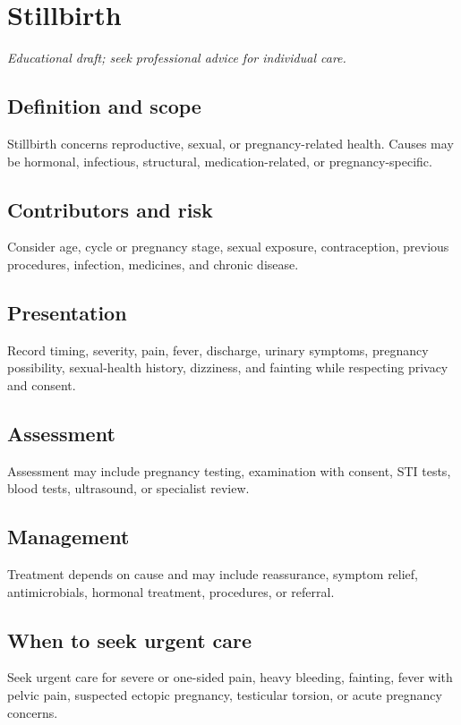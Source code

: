 \chapter{Stillbirth}
\medskip
\noindent\textit{Educational draft; seek professional advice for individual care.}

\section*{Definition and scope}
Stillbirth concerns reproductive, sexual, or pregnancy-related health. Causes may be hormonal, infectious, structural, medication-related, or pregnancy-specific.

\section*{Contributors and risk}
Consider age, cycle or pregnancy stage, sexual exposure, contraception, previous procedures, infection, medicines, and chronic disease.

\section*{Presentation}
Record timing, severity, pain, fever, discharge, urinary symptoms, pregnancy possibility, sexual-health history, dizziness, and fainting while respecting privacy and consent.

\section*{Assessment}
Assessment may include pregnancy testing, examination with consent, STI tests, blood tests, ultrasound, or specialist review.

\section*{Management}
Treatment depends on cause and may include reassurance, symptom relief, antimicrobials, hormonal treatment, procedures, or referral.

\section*{When to seek urgent care}
Seek urgent care for severe or one-sided pain, heavy bleeding, fainting, fever with pelvic pain, suspected ectopic pregnancy, testicular torsion, or acute pregnancy concerns.


